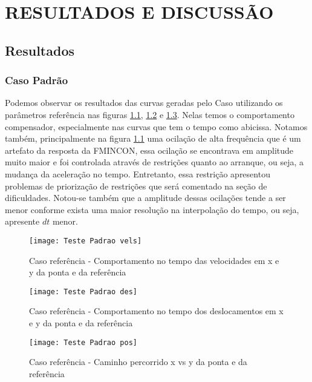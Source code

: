 \chapter{RESULTADOS E DISCUSSÃO}
\section{Resultados}
\subsection{Caso Padrão}
Podemos observar os resultados das curvas geradas pelo Caso utilizando os parâmetros referência nas figuras
\ref{fig:t_padr_vels}, \ref{fig:t_padr_des} e \ref{fig:t_padr_pos}. Nelas temos o comportamento compensador,
especialmente nas curvas que tem o tempo como abicissa.
Notamos também, principalmente na figura \ref{fig:t_padr_vels} uma ocilação de alta frequência que é um artefato
da resposta da FMINCON, essa ocilação se encontrava em amplitude muito maior e foi controlada através de restrições quanto ao 
arranque, ou seja, a mudança da aceleração no tempo. Entretanto, essa restrição apresentou problemas de priorização
de restrições que será comentado na seção de dificuldades. Notou-se também que a amplitude dessas ocilações tende a ser menor
conforme exista uma maior resolução na interpolação do tempo, ou seja, apresente $dt$ menor.

\begin{figure}[!htb]
    \begin{center}
    \caption{Caso referência - Comportamento no tempo das velocidades em x e y da ponta e da referência}
    \texttt{[image: Teste Padrao vels]}
    \label{fig:t_padr_vels}
    \end{center}
\end{figure}

\begin{figure}[!htb]
    \begin{center}
    \caption{Caso referência - Comportamento no tempo dos deslocamentos em x e y da ponta e da referência}
    \texttt{[image: Teste Padrao des]}
    \label{fig:t_padr_des}
    \end{center}
\end{figure}

\begin{figure}[!htb]
    \begin{center}
    \caption{Caso referência - Caminho percorrido x vs y da ponta e da referência}
    \texttt{[image: Teste Padrao pos]}
    \label{fig:t_padr_pos}
    \end{center}
\end{figure}

